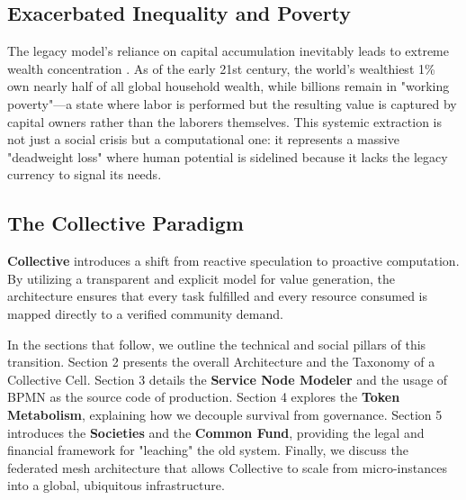 \subsection{Exacerbated Inequality and Poverty}
The legacy model’s reliance on capital accumulation inevitably leads to extreme wealth concentration \cite{oxfam2024}. As of the early 21st century, the world’s wealthiest 1\% own nearly half of all global household wealth, while billions remain in "working poverty"—a state where labor is performed but the resulting value is captured by capital owners rather than the laborers themselves. This systemic extraction is not just a social crisis but a computational one: it represents a massive "deadweight loss" where human potential is sidelined because it lacks the legacy currency to signal its needs.

\subsection{The Collective Paradigm}
\textbf{Collective} introduces a shift from reactive speculation to proactive computation. By utilizing a transparent and explicit model for value generation, the architecture ensures that every task fulfilled and every resource consumed is mapped directly to a verified community demand. 

In the sections that follow, we outline the technical and social pillars of this transition. Section 2 presents the overall Architecture and the Taxonomy of a Collective Cell. Section 3 details the \textbf{Service Node Modeler} and the usage of BPMN as the source code of production. Section 4 explores the \textbf{Token Metabolism}, explaining how we decouple survival from governance. Section 5 introduces the \textbf{Societies} and the \textbf{Common Fund}, providing the legal and financial framework for "leaching" the old system. Finally, we discuss the federated mesh architecture that allows Collective to scale from micro-instances into a global, ubiquitous infrastructure.